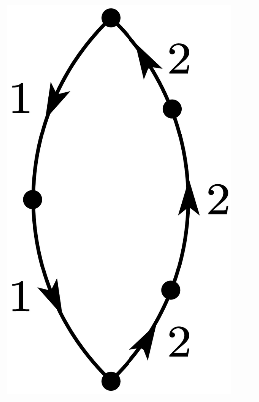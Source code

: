 \documentclass[a4paper]{book}
\newcounter{solution}[chapter]
\begin{document}
\begin{solution}
\begin{center}
\begin{tabular}{cccc}
		\begin{minipage}{0.22\linewidth}
		\centering
		\includegraphics[scale=1.0,trim=0 -4 0 -4]{./pictures/6.01/5.png}
		\captionof*{figure}{$\displaystyle (-1)^{2+1} \frac{ V_{11} V_{12} V_{21} V^2_{22} }{ ( E^{(0)}_1 - E^{(0)}_2)^4 }$}
		\end{minipage} &
		

\end{tabular}
\end{center}
\end{solution}
\end{document}
